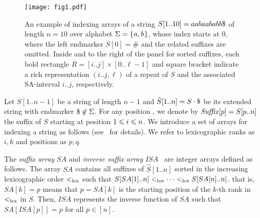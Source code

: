 

\begin{figure}[t]
\centering  
\texttt{[image: fig1.pdf]}
\vspace{.5\baselineskip}
\caption{An example of indexing arrays of a string $S[1..10] = aabaababb\daller$ of length $n = 10$ over alphabet $\Sigma = \set{a, b}$, whose index starts at $0$, where the left endmarker $S[0]=\#$ and the related suffixes are omitted. 
  Inside and to the right of the panel for sorted suffixes, each bold rectangle $R = [i..j]\times [0..\ell-1]$ and square bracket
indicate a rich representation $(i..j, \ell)$ of a repeat of $S$ and 
the associated SA-interval $i..j$, respectively. 
}\label{fig:example:arrays}
\end{figure}

Let $S[1..n-1]$ be a string of length $n-1$ and $\hat S[1..n] = S\cdot \daller$ be its extended string with endmarker $\daller \not\in \Sigma$. For any position , we denote by $\Suf[p] = S[p..n]$ the suffix of $S$ starting at position $\btw i1n$. 
We introduce a set of arrays for indexing a string as follows (see~\cite{navarro2016cds:book} for details).
We refer to lexicographic ranks as $i, k$ and positions as $p, q$.


The \textit{suffix array} $SA$ and \textit{inverse suffix array} $ISA$~\cite{manber:myers1993suffixarrays} are integer arrays defined as follows. 
The array $SA$ contains all suffixes of $\hat S[1..n]$ sorted in the increasing lexicographic order $<_\lex$ such that 
$S[SA[1]..n]<_\lex \dots <_\lex S[SA[n]..n]$. that is, $SA[k] = p$ means that $p = SA[k]$ is the starting position of the $k$-th rank in $<_\lex$ in $S$. 
Then, $ISA$ represents the inverse function of $SA$ such that $SA[ISA[p]] = p$ for all $p \in [n]$.

